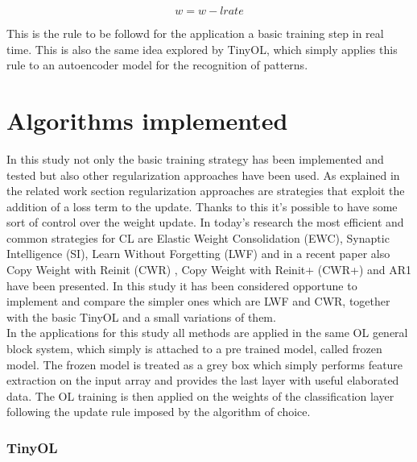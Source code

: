 \documentclass[12pt]{report}
\begin{document}
\begin{equation}
w = w- l rate
\end{equation}

This is the rule to be followd for the application a basic training step in real time. This is also the same idea explored by TinyOL, which simply applies this rule to an autoencoder model for the recognition of patterns. \\


\section{Algorithms implemented}
In this study not only the basic training strategy has been implemented and tested but also other regularization approaches have been used. As explained in the related work section regularization approaches are strategies that exploit the addition of a loss term to the update. Thanks to this it's possible to have some sort of control over the weight update. In today's research the most efficient and common strategies for CL are Elastic Weight Consolidation (EWC), Synaptic Intelligence (SI), Learn Without Forgetting (LWF) \cite{li2017learning} and in a recent paper also Copy Weight with Reinit (CWR) \cite{lomonaco2017core50}, Copy Weight with Reinit+ (CWR+) \cite{maltoni2019continuous} and AR1 \cite{maltoni2019continuous} have been presented. In this study it has been considered opportune to implement and compare the simpler ones which are LWF and CWR, together with the basic TinyOL and a small variations of them. \\
In the applications for this study all methods are applied in the same OL general block system, which simply is attached to a pre trained model, called frozen model. The frozen model is treated as a grey box which simply performs feature extraction on the input array and provides the last layer with useful elaborated data. The OL training is then applied on the weights of the classification layer following the update rule imposed by the algorithm of choice.

\subsubsection{TinyOL}
\end{document}
